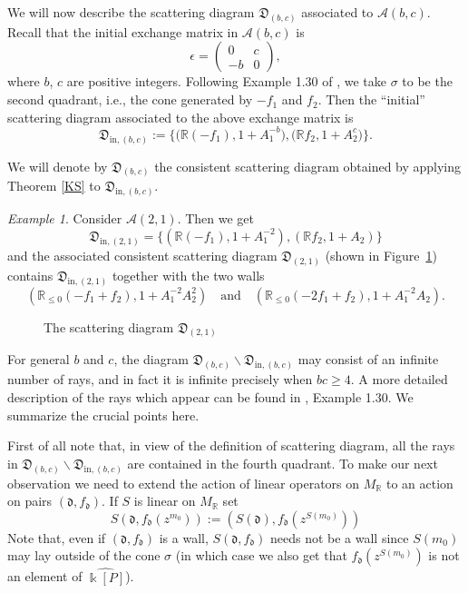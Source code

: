 \documentclass[12pt]{amsart}
\theoremstyle{remark}
\newtheorem{example}[theorem]{Example}
\numberwithin{equation}{section}
\newcommand{\RR}{\mathbb{R}}
\newcommand{\cA}{\mathcal{A}}
\newcommand{\dd}{\mathfrak{d}}
\newcommand{\DD}{\mathfrak{D}}
\begin{document}
We will now describe the scattering diagram $\DD_{(b,c)}$ associated to 
$\cA(b,c)$.
Recall that the initial exchange matrix in $\cA(b,c)$ is 
\[
  \epsilon = \begin{pmatrix} 0 & c\\ -b & 0\end{pmatrix},
\]
where $b$, $c$ are positive integers.  Following Example 1.30 of \cite{GHKK}, we
take $\sigma$ to be the second quadrant, i.e., the cone generated by $-f_1$ and
$f_2$. Then the ``initial'' scattering diagram associated to the above exchange
matrix is
\[
  \DD_{\mathrm{in},(b,c)} := 
  \big\{
    \big( \RR (-f_1), 1+A_1^{-b}\big), 
    \big( \RR f_2, 1+A_2^c\big) 
  \big\}.
\]

We will denote by $\DD_{(b,c)}$ the consistent scattering diagram obtained by
applying Theorem \ref{KS} to $\DD_{\mathrm{in},(b,c)}$.

\begin{example} 
  \label{ex}
  Consider $\cA(2,1)$. Then we get
  \[
    \DD_{\mathrm{in},(2,1)} =  
    \{ 
      (\RR (-f_1), 1+A_1^{-2}), 
      (\RR f_2, 1+A_2)  
    \}   
  \]
  and the associated consistent scattering diagram $\DD_{(2,1)}$ (shown in
  Figure~\ref{fig:diagex}) contains $\DD_{\mathrm{in},(2,1)}$ together with
  the two walls
  \[ 
    \left( \RR_{\leq 0} (-f_1+f_2), 1+A_1^{-2}A_2^2 \right)
    \quad \mbox{and} \quad
    \left( \RR_{\leq 0} (-2f_1+f_2), 1+A_1^{-2}A_2 \right).
  \]
\end{example}

\begin{figure}
  \centering
  \caption{The scattering diagram $\DD_{(2,1)}$} 
  \label{fig:diagex}
\end{figure}

For general $b$ and $c$, the diagram $\DD_{(b,c)} \backslash
\DD_{\mathrm{in},(b,c)}$ may consist of an infinite number of rays, and in fact
it is infinite precisely when $bc\ge 4$. A more detailed description of the rays
which appear can be found in \cite{GHKK}, Example 1.30. We summarize the crucial
points here.

First of all note that, in view of the definition of scattering diagram, all the
rays in  $\DD_{(b,c)} \backslash \DD_{\mathrm{in},(b,c)}$ are contained in the
fourth quadrant.  To make our next observation we need to extend the action of
linear operators on $M_\RR$ to an action on pairs $(\dd,f_\dd)$. If $S$ is
linear on $M_\RR$ set
\begin{equation}
  \label{eqn:linear action}
  S(\dd,f_\dd(z^{m_0}))
  :=
  \left( S(\dd), f_\dd(z^{S(m_0)}) \right)
\end{equation}
Note that, even if $(\dd,f_\dd)$ is a wall, $S(\dd,f_\dd)$ needs not be a wall
since $S(m_0)$ may lay outside of the cone $\sigma$ (in which case we also get
that  $f_\dd(z^{S(m_0)})$ is not an element of $\widehat{\Bbbk [P]}$).
\end{document}

